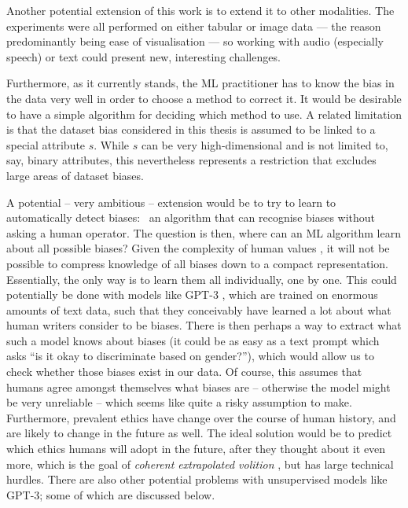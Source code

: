 Another potential extension of this work is to extend it to other modalities.
The experiments were all performed on either tabular or image data
--- the reason predominantly being ease of visualisation ---
so working with audio (especially speech) or text could present new, interesting challenges.

Furthermore, as it currently stands,
the \ac{ML} practitioner has to know the bias in the data very well in order to choose a method to correct it.
It would be desirable to have a simple algorithm for deciding which method to use.
A related limitation is that the dataset bias considered in this thesis
is assumed to be linked to a special attribute \(s\).
While \(s\) can be very high-dimensional and is not limited to, say, binary attributes,
this nevertheless represents a restriction
that excludes large areas of dataset biases.

A potential -- very ambitious -- extension would be
to try to learn to automatically detect biases:
\ie\ an algorithm that can recognise biases without asking a human operator.
The question is then, where can an \ac{ML} algorithm learn about all possible biases?
Given the complexity of human values \citep{yudkowsky2011complex},
it will not be possible to compress knowledge of all biases down to a compact representation.
Essentially, the only way is to learn them all individually, one by one.
This could potentially be done with models like GPT-3 \citep{brown2020language},
which are trained on enormous amounts of text data,
such that they conceivably have learned a lot about what human writers consider to be biases.
There is then perhaps a way to extract what such a model knows about biases
(it could be as easy as a text prompt which asks ``is it okay to discriminate based on gender?''),
which would allow us to check whether those biases exist in our data.
Of course, this assumes that humans agree amongst themselves what biases are --
otherwise the model might be very unreliable --
which seems like quite a risky assumption to make.
Furthermore, prevalent ethics have change over the course of human history,
and are likely to change in the future as well.
The ideal solution would be to predict which ethics humans will adopt in the future,
after they thought about it even more,
which is the goal of \emph{coherent extrapolated volition} \citep{tarleton2010coherent},
but has large technical hurdles.
There are also other potential problems with unsupervised models like GPT-3;
some of which are discussed below.


